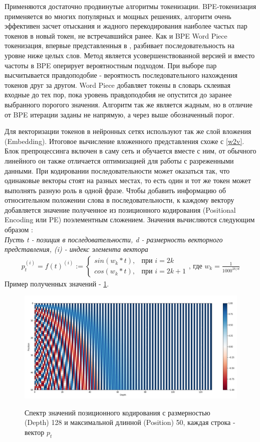 Применяются достаточно продвинутые алгоритмы токенизации. BPE-токенизация \cite{bpe} применяется во многих популярных и мощных решениях, алгоритм очень эффективен засчет отыскания и жадного перекодирования наиболее частых пар токенов в новый токен, не встречавшийся ранее. Как и BPE Word Piece токенизация, впервые представленныя в \cite{word_piece}, разбивает последовательность на уровне ниже целых слов. Метод является усовершенствованной версией и вместо частоты в BPE оперирует вероятностным подходом. При выборе пар высчитывается правдоподобие - вероятность последовательного нахождения токенов друг за другом. Word Piece добавляет токены в словарь склеивая входные до тех пор, пока уровень правдоподобия не опустится до заранее выбранного порогого значения. Алгоритм так же является жадным, но в отличие от BPE итерации заданы не напрямую, а через выше обозначенный порог. 

Для векторизации токенов в нейронных сетях используют так же слой вложения (Embedding). Итоговое вычисление вложенного представления схоже с \ref{w2v}. Блок препроцессинга включен в саму сеть и обучается вместе с ним, от обычного линейного он также отличается оптимизацией для работы с разреженными данными.
При кодировании последовательности может оказаться так, что одинаковые векторы стоят на разных местах, то есть один и тот же токен может выполнять разную роль в одной фразе. Чтобы добавить информацию об относительном положении слова в последовательности, к каждому вектору добавляется значение полученное из позиционного кодирования (Positional Encoding или PE) поэлементным сложением. Значения вычисляются следующим образом \cite{transformer}\cite{pe}:\\
\textit{Пусть t - позиция в последовательности, d - размерность векторного представления, (i) - индекс элемента вектора} 
\begin{align*}
p_{t}^{(i)} = f(t)^{(i)} := 
\begin{cases} 
sin(w_{k} * t), & \textit{при } i=2k 
\\
cos(w_{k} * t), & \textit{при } i=2k +1
\end{cases}
\textit{, где }
w_{k} = \frac{1}{1000^{2k/d}}
\end{align*}
\newline
Пример полученных значений - \ref{pe_vals}.
\begin{figure}[h]
\caption{Спектр значений позиционного кодирования с размерностью (Depth) 128 и максимальной длинной (Position) 50, каждая строка - вектор $p_{t}$}
\centering
\includegraphics[width=1\textwidth]{positional_encoding.png}
\label{pe_vals}
\end{figure}
\newline